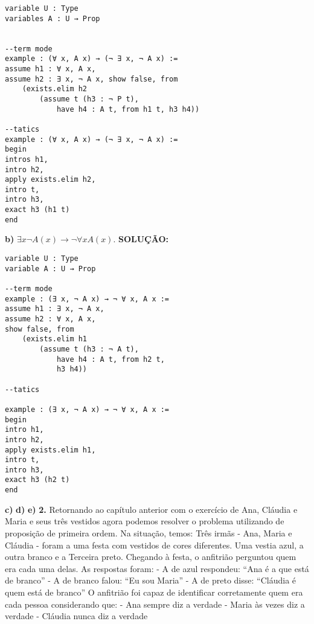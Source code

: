 \begin{lstlisting}
variable U : Type
variables A : U → Prop
    
    
--term mode
example : (∀ x, A x) → (¬ ∃ x, ¬ A x) :=
assume h1 : ∀ x, A x,
assume h2 : ∃ x, ¬ A x, show false, from
    (exists.elim h2
        (assume t (h3 : ¬ P t), 
            have h4 : A t, from h1 t, h3 h4))
    
--tatics
example : (∀ x, A x) → (¬ ∃ x, ¬ A x) :=
begin
intros h1,
intro h2,
apply exists.elim h2,
intro t,
intro h3,
exact h3 (h1 t)
end 
\end{lstlisting}
\textbf{b)} $\exists x \neg A (x) \to \neg \forall x A(x)$.
\newline \textbf{SOLUÇÃO:} 
\begin{lstlisting}
variable U : Type
variable A : U → Prop

--term mode
example : (∃ x, ¬ A x) → ¬ ∀ x, A x :=
assume h1 : ∃ x, ¬ A x,
assume h2 : ∀ x, A x, 
show false, from 
    (exists.elim h1
        (assume t (h3 : ¬ A t),
            have h4 : A t, from h2 t,
            h3 h4))
        
--tatics

example : (∃ x, ¬ A x) → ¬ ∀ x, A x :=
begin
intro h1,
intro h2,
apply exists.elim h1,
intro t,
intro h3,
exact h3 (h2 t)
end
\end{lstlisting}
\textbf{c)}
\textbf{d)}
\textbf{e)}
\newline \textbf{2.} Retornando ao capítulo anterior com o exercício de Ana, Cláudia e Maria e seus três vestidos
agora podemos resolver o problema utilizando de proposição de primeira ordem. Na situação, temos: 
\newline Três irmãs - Ana, Maria e Cláudia - foram a uma festa com vestidos de
cores diferentes. Uma vestia azul, a outra branco e a Terceira
preto. Chegando à festa, o anfitrião perguntou quem era cada uma
delas. As respostas foram:
\newline - A de azul respondeu: “Ana é a que está de branco”
\newline - A de branco falou: “Eu sou Maria”
\newline - A de preto disse:  “Cláudia é quem está de branco”
\newline O anfitrião foi capaz de identificar corretamente quem era cada pessoa
considerando que:
\newline - Ana sempre diz a verdade
\newline - Maria às vezes diz a verdade
\newline - Cláudia nunca diz a verdade
